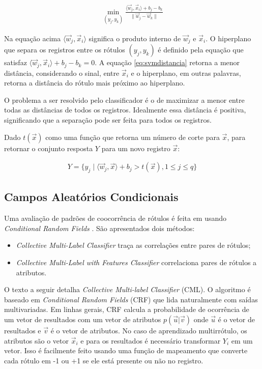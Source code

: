 \documentclass[runningheads,a4paper]{llncs}
\begin{document}
\begin{align} \label{eq:svmdistancia}
	\min_{(y_j, y_k)} \frac{\langle \vec{w}_j, \vec{x}_i \rangle + b_j - b_k}{\lVert \vec{w}_j - \vec{w}_k \rVert}
\end{align}

Na equação acima $\langle \vec{w}_j, \vec{x}_i \rangle$ significa o produto interno de $\vec{w}_j$ e $\vec{x}_i$. O hiperplano que separa os registros entre os rótulos $(y_j, y_k)$ é definido pela equação que satisfaz $\langle \vec{w}_j, \vec{x}_i \rangle + b_j - b_k = 0$.  A equação \ref{eq:svmdistancia} retorna a menor distância, considerando o sinal, entre $\vec{x}_i$ e o hiperplano, em outras palavras, retorna a distância do rótulo mais próximo ao hiperplano.

O problema a ser resolvido pelo classificador é o de maximizar a menor entre todas as distâncias de todos os registros. Idealmente essa distância é positiva, significando que a separação pode ser feita para todos os registros.

Dado $t(\vec{x})$ como uma função que retorna um número de corte para $\vec{x}$, para retornar o conjunto resposta $Y$ para um novo registro $\vec{x}$:

\begin{align*}
	Y = \{ y_j \mid \langle \vec{w}_j,\vec{x} \rangle + b_j > t(\vec{x}), 1 \leq j \leq q \}
\end{align*}


\subsection{Campos Aleatórios Condicionais}\label{sec:crf}
Uma avaliação de padrões de coocorrência de rótulos é feita em \cite{Ghamrawi2005-fw} usando \textit{Conditional Random Fields} \cite{Lafferty2001-ov}. São apresentados dois métodos: 

\begin{itemize}
	\item \textit{Collective Multi-Label Classifier} traça as correlações entre pares de rótulos;
	\item \textit{Collective Multi-Label with Features Classifier} correlaciona pares de rótulos a atributos.	
\end{itemize}

O texto a seguir detalha \textit{Collective Multi-label Classifier} (CML). O algoritmo é baseado em \textit{Conditional Random Fields} (CRF) que lida naturalmente com saídas multivariadas. Em linhas gerais, CRF calcula a probabilidade de ocorrência de um vetor de resultados com um vetor de atributos $p(\vec{u} | \vec{v})$ onde $\vec{u}$ é o vetor de resultados e $\vec{v}$ é o vetor de atributos. No caso de aprendizado multirrótulo, os atributos são o vetor $\vec{x}_i$ e para os resultados é necessário transformar $Y_i$ em um vetor. Isso é facilmente feito usando uma função de mapeamento que converte cada rótulo em -1 ou +1 se ele está presente ou não no registro.
\end{document}
